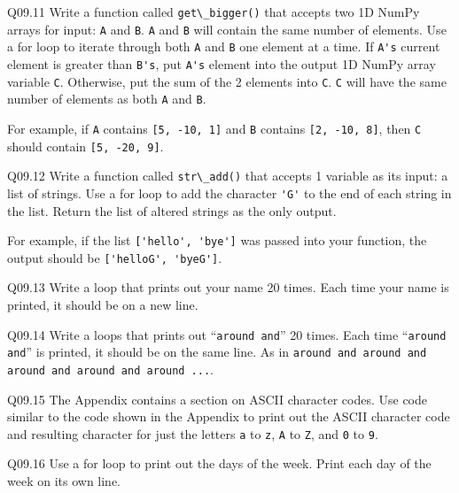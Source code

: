 \documentclass{book}
\newenvironment{problems}{}{}  %
\newcommand{\passthrough}[1]{#1}
\begin{document}
\begin{problems}
Q09.11 Write a function called \passthrough{\lstinline!get\_bigger()!}
that accepts two 1D NumPy arrays for input: \passthrough{\lstinline!A!}
and \passthrough{\lstinline!B!}. \passthrough{\lstinline!A!} and
\passthrough{\lstinline!B!} will contain the same number of elements.
Use a for loop to iterate through both \passthrough{\lstinline!A!} and
\passthrough{\lstinline!B!} one element at a time. If
\passthrough{\lstinline!A's!} current element is greater than
\passthrough{\lstinline!B's!}, put \passthrough{\lstinline!A's!} element
into the output 1D NumPy array variable \passthrough{\lstinline!C!}.
Otherwise, put the sum of the 2 elements into
\passthrough{\lstinline!C!}. \passthrough{\lstinline!C!} will have the
same number of elements as both \passthrough{\lstinline!A!} and
\passthrough{\lstinline!B!}.

For example, if \passthrough{\lstinline!A!} contains
\passthrough{\lstinline![5, -10, 1]!} and \passthrough{\lstinline!B!}
contains \passthrough{\lstinline![2, -10, 8]!}, then
\passthrough{\lstinline!C!} should contain
\passthrough{\lstinline![5, -20, 9]!}.

Q09.12 Write a function called \passthrough{\lstinline!str\_add()!} that
accepts 1 variable as its input: a list of strings. Use a for loop to
add the character \passthrough{\lstinline!'G'!} to the end of each
string in the list. Return the list of altered strings as the only
output.

For example, if the list \passthrough{\lstinline!['hello', 'bye']!} was
passed into your function, the output should be
\passthrough{\lstinline!['helloG', 'byeG']!}.

Q09.13 Write a loop that prints out your name 20 times. Each time your
name is printed, it should be on a new line.

Q09.14 Write a loops that prints out
``\passthrough{\lstinline!around and!}'' 20 times. Each time
``\passthrough{\lstinline!around and!}'' is printed, it should be on the
same line. As in
\passthrough{\lstinline!around and around and around and around and around ...!}.

Q09.15 The Appendix contains a section on ASCII character codes. Use
code similar to the code shown in the Appendix to print out the ASCII
character code and resulting character for just the letters
\passthrough{\lstinline!a!} to \passthrough{\lstinline!z!},
\passthrough{\lstinline!A!} to \passthrough{\lstinline!Z!}, and
\passthrough{\lstinline!0!} to \passthrough{\lstinline!9!}.

Q09.16 Use a for loop to print out the days of the week. Print each day
of the week on its own line.


\end{problems}
\end{document}
